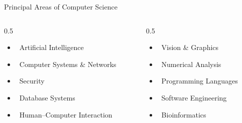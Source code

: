 \documentclass[aspectratio=169]{beamer}
\begin{document}
\begin{frame}{Principal Areas of Computer Science}
  \begin{columns}[T]
    \begin{column}{0.5\textwidth}
      \begin{itemize}[<+->]
        \item \faRobot\, Artificial Intelligence
        \item \faNetworkWired\, Computer Systems \& Networks
        \item \faShieldAlt\, Security          %
        \item \faDatabase\, Database Systems
        \item \faUser\, Human--Computer Interaction
      \end{itemize}
    \end{column}
    \begin{column}{0.5\textwidth}
      \begin{itemize}[<+->]
        \item \faEye\, Vision \& Graphics
        \item \faCalculator\, Numerical Analysis
        \item \faCode\, Programming Languages
        \item \faCogs\, Software Engineering
        \item \faDna\, Bioinformatics
      \end{itemize}
    \end{column}
  \end{columns}
  \vspace{0.4cm}
\end{frame}
\end{document}
